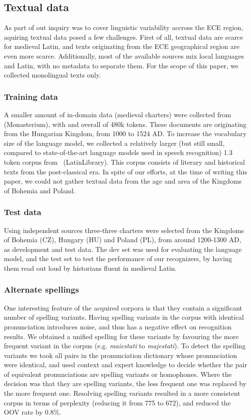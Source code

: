 \documentclass[runningheads,a4paper]{llncs}
\begin{document}
\subsection{Textual data}\label{text}
As part of out inquiry was to cover linguistic variability accross the ECE region, aquiring textual data posed a few challenges.
First of all, textual data are scarce for medieval Latin, and texts originating from the ECE geographical region are even more scarce.
Additionally, most of the available sources mix local languages and Latin, with no metadata to separate them.
For the scope of this paper, we collected monolingual texts only.
\subsubsection{Training data}
A smaller amount of in-domain data (medieval charters) were collected from~\cite{monasterium} (Monasterium), with and overall of 480k tokens.
These documents are originating from the Hungarian Kingdom, from 1000 to 1524 AD.
To increase the vocabulary size of the language model, we collected a relatively larger (but still small, compared to state-of-the-art language models used in speech recognition) 1.3 token corpus from~\cite{latinlibrary} (LatinLibrary).
This corpus consists of literary and historical texts from the post-classical era.
In spite of our efforts, at the time of writing this paper, we could not gather textual data from the age and area of the Kingdoms of Bohemia and Poland.
\subsubsection{Test data}
Using independent sources three-three charters were selected from the Kingdoms of Bohemia (CZ), Hungary (HU) and Poland (PL), from around 1200-1300 AD, as development and test data.
The dev set was used for evaluating the language model, and the test set to test the performance of our recognizers, by having them read out loud by historians fluent in medieval Latin.
\subsubsection{Alternate spellings}
One interesting feature of the acquired corpora is that they contain a significant number of spelling variants.
Having spelling variants in the corpus with identical pronunciation introduces noise, and thus has a negative effect on recognition results.
We obtained a unified spelling for these variants by favouring the more frequent variant in the corpus (e.g. \textit{maiestati} to \textit{majestati}).
To detect the spelling variants we took all pairs in the pronunciation dictionary whose pronunciation were identical, and used context and expert knowledge to decide whether the pair of equivalent pronunciations are spelling variants or homophones.
Where the decision was that they are spelling variants, the less frequent one was replaced by the more frequent one.
Resolving spelling variants resulted in a more consistent corpus in terms of perplexity (reducing it from 775 to 672), and reduced the OOV rate by 0.8\%.
\end{document}
